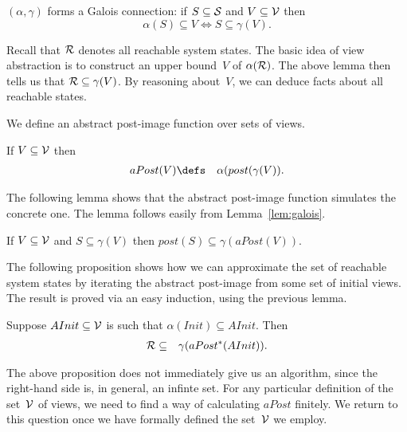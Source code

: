 

\begin{lemma}
\label{lem:galois}
$(\alpha, \gamma)$ forms a Galois connection: if $S \subseteq \S$ and $V
  \subseteq \V$ then 
\[
\alpha(S) \subseteq V \iff S \subseteq \gamma(V).
\]
\end{lemma}
%


Recall that $\R$ denotes all reachable system states.  The basic idea of view
abstraction is to construct an upper bound~$V$ of $\alpha(\R)$.  The above
lemma then tells us that $\R \subseteq \gamma(V)$.  By reasoning about~$V$, we
can deduce facts about all reachable states. 

We define an abstract post-image function over sets of views.
%
\begin{definition}
If $V \subseteq \V$ then 
\begin{eqnarray*}
aPost(V) & \defs & \alpha(post(\gamma(V)).
\end{eqnarray*}
\end{definition}
%
The following lemma shows that the abstract post-image function simulates the
concrete one.  The lemma follows easily from  Lemma~\ref{lem:galois}.
%
\begin{lemma}
If $V \subseteq \V$ and $S \subseteq \gamma(V)$ then 
$post(S) \subseteq \gamma(aPost(V))$.
\end{lemma}
%
The following proposition shows how we can approximate the set of reachable
system states by iterating the abstract post-image from some set of initial
views.  The result is proved via an easy induction, using the previous lemma.
%
\begin{prop}
\label{prop:reachable}
Suppose $AInit \subseteq \V$ is such that $\alpha(Init) \subseteq AInit$.  Then
\begin{eqnarray*}
\R & \subseteq & \gamma (aPost^*(AInit)).
\end{eqnarray*}
\end{prop}

The above proposition does not immediately give us an algorithm, since the
right-hand side is, in general, an infinte set.  For any particular definition
of the set~$\V$ of views, we need to find a way of calculating $aPost$
finitely.  We return to this question once we have formally defined the
set~$\V$ we employ. 

